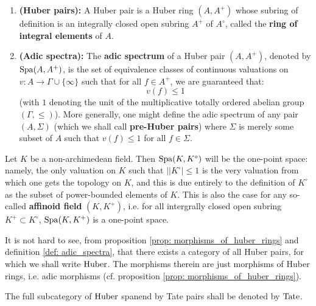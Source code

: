             \begin{definition} \label{def: adic_spectra}
                \noindent
                \begin{enumerate}
                    \item \textbf{(Huber pairs):} A Huber pair is a Huber ring $(A, A^+)$ whose subring of definition is an integrally closed open subring $A^+$ of $A^{\circ}$, called the \textbf{ring of integral elements} of $A$.
                    \item \textbf{(Adic spectra):} The \textbf{adic spectrum} of a Huber pair $(A, A^+)$, denoted by $\mathrm{Spa} (A, A^+)$, is the set of equivalence classes of continuous valuations on $v: A \to \Gamma \cup \{\infty\}$ such that for all $f \in A^+$, we are guaranteed that:
                        $$v(f) \leq 1$$
                    (with $1$ denoting the unit of the multiplicative totally ordered abelian group $(\Gamma, \leq)$). More generally, one might define the adic spectrum of any pair $(A, \Sigma)$ (which we shall call \textbf{pre-Huber pairs}) where $\Sigma$ is merely some subset of $A$ such that $v(f) \leq 1$ for all $f \in \Sigma$. 
                \end{enumerate}
            \end{definition}
            \begin{example} \label{example: affinoid_fields}
                Let $K$ be a non-archimedean field. Then $\mathrm{Spa}(K, K^{\circ})$ will be the one-point space: namely, the only valuation on $K$ such that $||K^{\circ}| \leq 1$ is the very valuation from which one gets the topology on $K$, and this is due entirely to the definition of $K^{\circ}$ as the subset of power-bounded elements of $K$. This is also the case for any so-called \textbf{affinoid field} $(K, K^+)$, i.e. for all intergrally closed open subring $K^+ \subset K^{\circ}$, $\mathrm{Spa}(K, K^+)$ is a one-point space.
            \end{example}
            \begin{remark}
                It is not hard to see, from proposition \ref{prop: morphisms_of_huber_rings} and definition \ref{def: adic_spectra}, that there exists a category of all Huber pairs, for which we shall write $\mathrm{Huber}$. The morphisms therein are just morphisms of Huber rings, i.e. adic morphisms (cf. proposition \ref{prop: morphisms_of_huber_rings}).
                
                The full subcategory of $\mathrm{Huber}$ spanend by Tate pairs shall be denoted by $\mathrm{Tate}$.
            \end{remark}
            
